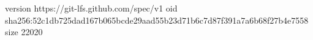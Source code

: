 version https://git-lfs.github.com/spec/v1
oid sha256:52c1db725dad167b065bcde29aad55b23d71b6c7d87f391a7a6b68f27b4e7558
size 22020
